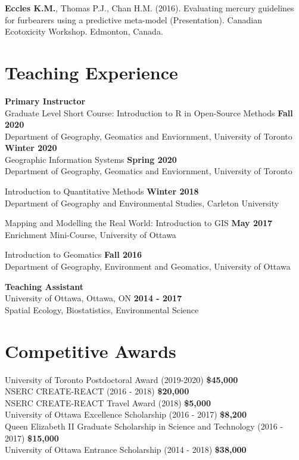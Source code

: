 \documentclass[margin,line]{res}
\begin{document}
\begin{resume}
\textbf{Eccles K.M.}, Thomas P.J., Chan H.M. (2016). Evaluating mercury guidelines for furbearers using a predictive meta-model (Presentation). Canadian Ecotoxicity Workshop. Edmonton, Canada.\\

\vspace*{.1in}
\section{\sc Teaching Experience}
\textbf{Primary Instructor}\\
Graduate Level Short Course: Introduction to R in Open-Source Methods \hfill {\textbf{Fall 2020}}\\
Department of Geography, Geomatics and Enviornment, University of Toronto \hfill {\textbf{Winter 2020}}\\

Geographic Information Systems \hfill {\textbf{Spring 2020}}\\
Department of Geography, Geomatics and Enviornment, University of Toronto

Introduction to Quantitative Methods
 \hfill {\textbf{Winter 2018}}\\
Department of Geography and Environmental Studies, Carleton University

Mapping and Modelling the Real World: Introduction to GIS \hfill {\textbf{May 2017}}\\
Enrichment Mini-Course, University of Ottawa

Introduction to Geomatics
\hfill {\textbf{Fall 2016}}\\
Department of Geography, Environment and Geomatics, University of Ottawa

\textbf{Teaching Assistant }\\
University of Ottawa, Ottawa, ON
\hfill {\textbf{2014 - 2017}}\\
Spatial Ecology, Biostatistics, Environmental Science

\vspace*{.1in}

\section{\sc Competitive Awards}

University of Toronto Postdoctoral Award
(2019-2020)
\hfill {\textbf{\$45,000}}\\
NSERC CREATE-REACT (2016 - 2018)
\hfill {\textbf{\$20,000}}\\
NSERC CREATE-REACT Travel Award (2018)
\hfill {\textbf{\$5,000}}\\
University of Ottawa Excellence Scholarship (2016 - 2017)
\hfill {\textbf{\$8,200}}\\
Queen Elizabeth II Graduate Scholarship in Science and Technology (2016 - 2017)
\hfill {\textbf{\$15,000}}\\
University of Ottawa Entrance Scholarship (2014 - 2018)
\hfill {\textbf{\$38,000}}\\


\end{resume}
\end{document}

